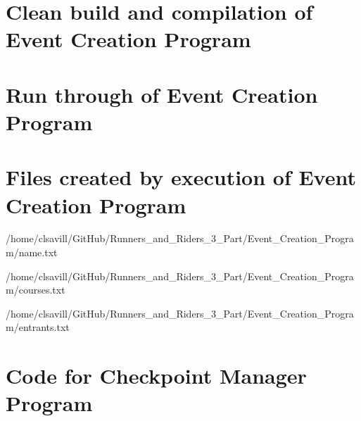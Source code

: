 \documentclass[a4paper,12pt]{article}
\begin{document}
\section{Clean build and compilation of Event Creation Program}


\newpage

\section{Run through of Event Creation Program}


\section{Files created by execution of Event Creation Program}

{/home/clsavill/GitHub/Runners_and_Riders_3_Part/Event_Creation_Program/name.txt}


{/home/clsavill/GitHub/Runners_and_Riders_3_Part/Event_Creation_Program/courses.txt}


{/home/clsavill/GitHub/Runners_and_Riders_3_Part/Event_Creation_Program/entrants.txt}

\newpage

\section{Code for Checkpoint Manager Program}
\end{document}
